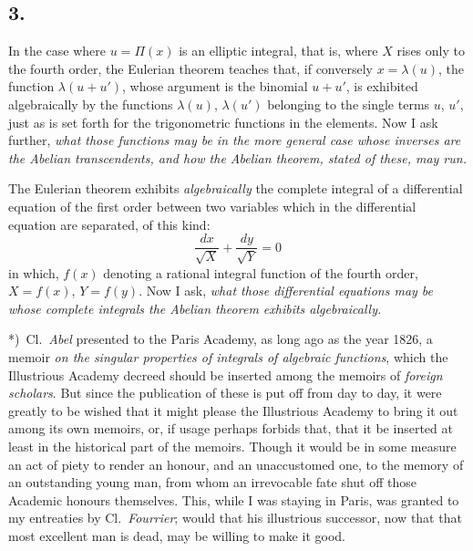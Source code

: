 \documentclass{article}
\begin{document}
\subsection*{3.}

In the case where $u = \Pi(x)$ is an elliptic integral, that is, where $X$ rises only to the fourth order, the Eulerian theorem teaches that, if conversely $x = \lambda(u)$, the function $\lambda(u + u')$, whose argument is the binomial $u + u'$, is exhibited algebraically by the functions $\lambda(u)$, $\lambda(u')$ belonging to the single terms $u$, $u'$, just as is set forth for the trigonometric functions in the elements. Now I ask further, \emph{what those functions may be in the more general case whose inverses are the Abelian transcendents, and how the Abelian theorem, stated of these, may run.}

The Eulerian theorem exhibits \emph{algebraically} the complete integral of a differential equation of the first order between two variables which in the differential equation are separated, of this kind:
\[ \frac{dx}{\sqrt{X}} + \frac{dy}{\sqrt{Y}} = 0 \]
in which, $f(x)$ denoting a rational integral function of the fourth order, $X = f(x)$, $Y = f(y)$. Now I ask, \emph{what those differential equations may be whose complete integrals the Abelian theorem exhibits algebraically.}

*)~Cl.\ \emph{Abel} presented to the Paris Academy, as long ago as the year 1826, a memoir \emph{on the singular properties of integrals of algebraic functions}, which the Illustrious Academy decreed should be inserted among the memoirs of \emph{foreign scholars}. But since the publication of these is put off from day to day, it were greatly to be wished that it might please the Illustrious Academy to bring it out among its own memoirs, or, if usage perhaps forbids that, that it be inserted at least in the historical part of the memoirs. Though it would be in some measure an act of piety to render an honour, and an unaccustomed one, to the memory of an outstanding young man, from whom an irrevocable fate shut off those Academic honours themselves. This, while I was staying in Paris, was granted to my entreaties by Cl.\ \emph{Fourrier}; would that his illustrious successor, now that that most excellent man is dead, may be willing to make it good.
\end{document}

